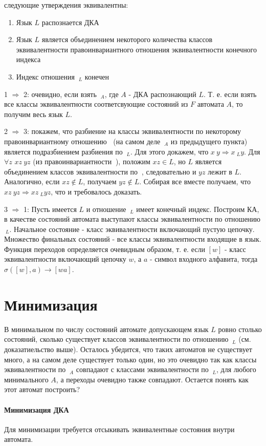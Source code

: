\begin{Proof}
\item следующие утверждения эквивалентны:
\begin{enumerate}
\item Язык $L$ распознается ДКА

\item Язык $L$ является объединением некоторого количества классов эквивалентности правоинвариантного отношения эквивалентности конечного индекса

\item Индекс отношения $~_L$ конечен
\end{enumerate}
1 $\Rightarrow$ 2: очевидно, если взять $~_A$, где $A$ - ДКА распознающий $L$. Т. е. если взять все классы эквивалентности соответсвующие состояний из $F$
автомата $A$, то получим весь язык $L$.

2 $\Rightarrow$ 3: покажем, что разбиение на классы эквивалентности по некоторому правоинвариантному отношению $~$ (на самом деле $~_A$ из предыдущего пункта)
является подразбиением разбиения по $~_L$. Для этого докажем, что $x~y \Rightarrow x~_Ly$. Для $\forall z$ $xz~yz$ (из правоинвариантности $~$), положим $xz \in L$,
но $L$ является объединением классов эквивалентности по $~$, следовательно и $yz$ лежит в $L$. Аналогично, если $xz \not\in L$, получаем $yz \not\in L$. Собирая все
вместе получаем, что $xz~yz \Rightarrow xz~_Lyz$, что и требовалось доказать.

3 $\Rightarrow$ 1: Пусть имеется $L$ и отношение $~_L$ имеет конечный индекс. Построим КА, в качестве состояний автомата выступают классы эквивалентности по
отношению $~_L$. Начальное состояние - класс эквивалентности включающий пустую цепочку. Множество финальных состояний - все классы эквивалентности входящие в язык.
Функция переходов определяется очевидным образом, т. е. если $[w]$ - класс эквивалентности включающий цепочку $w$, а $a$ - символ входного алфавита, тогда
$\sigma\left([w],a\right) \rightarrow [wa]$.
\end{Proof}

\section{Минимизация}

В минимальном по числу состояний автомате допускающем язык $L$ ровно столько состояний, сколько существует классов эквивалентности по отношению $~_L$
(см. доказатиельство выше). Осталось убедится, что таких автоматов не существует много, а на самом деле существует только один, но это очевидно так как
классы эквивалентности по $~_A$ совпадают с классами эквивалентности по $~_L$, для любого минимального $A$, а переходы очевидно также совпадают. Остается
понять как этот автомат построить?

\paragraph{Минимизация ДКА} Для минимизации требуется отсыкивать эквивалентные состояния внутри автомата.